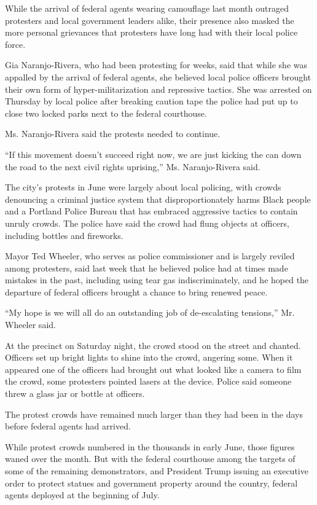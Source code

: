 While the arrival of federal agents wearing camouflage last month
outraged protesters and local government leaders alike, their presence
also masked the more personal grievances that protesters have long had
with their local police force.

Gia Naranjo-Rivera, who had been protesting for weeks, said that while
she was appalled by the arrival of federal agents, she believed local
police officers brought their own form of hyper-militarization and
repressive tactics. She was arrested on Thursday by local police after
breaking caution tape the police had put up to close two locked parks
next to the federal courthouse.

Ms. Naranjo-Rivera said the protests needed to continue.

``If this movement doesn't succeed right now, we are just kicking the
can down the road to the next civil rights uprising,'' Ms.
Naranjo-Rivera said.

The city's protests in June were largely about local policing, with
crowds denouncing a criminal justice system that disproportionately
harms Black people and a Portland Police Bureau that has embraced
aggressive tactics to contain unruly crowds. The police have said the
crowd had flung objects at officers, including bottles and fireworks.

Mayor Ted Wheeler, who serves as police commissioner and is largely
reviled among protesters, said last week that he believed police had at
times made mistakes in the past, including using tear gas
indiscriminately, and he hoped the departure of federal officers brought
a chance to bring renewed peace.

``My hope is we will all do an outstanding job of de-escalating
tensions,'' Mr. Wheeler said.

At the precinct on Saturday night, the crowd stood on the street and
chanted. Officers set up bright lights to shine into the crowd, angering
some. When it appeared one of the officers had brought out what looked
like a camera to film the crowd, some protesters pointed lasers at the
device. Police said someone threw a glass jar or bottle at officers.

The protest crowds have remained much larger than they had been in the
days before federal agents had arrived.

While protest crowds numbered in the thousands in early June, those
figures waned over the month. But with the federal courthouse among the
targets of some of the remaining demonstrators, and President Trump
issuing an executive order to protect statues and government property
around the country, federal agents deployed at the beginning of July.

